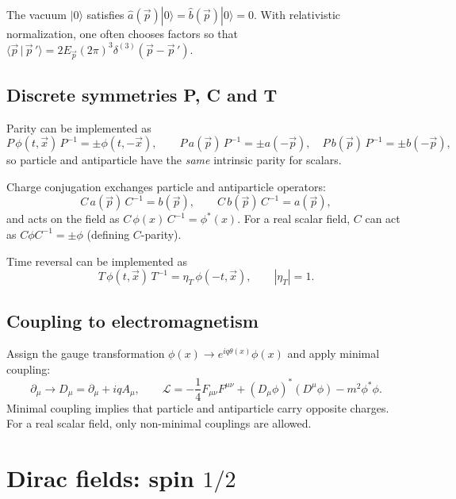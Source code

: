The vacuum $|0\rangle$ satisfies $\hat a(\vec p)|0\rangle=\hat b(\vec p)|0\rangle=0$.
With relativistic normalization, one often chooses factors so that
$\langle \vec p\,|\,\vec p\,'\rangle = 2E_{\vec p}(2\pi)^3\delta^{(3)}(\vec p-\vec p\,')$.

\subsection{Discrete symmetries P, C and T}
Parity can be implemented as
\begin{equation}
P\,\phi(t,\vec x)\,P^{-1}=\pm \phi(t,-\vec x),
\qquad
P\,a(\vec p)\,P^{-1}=\pm a(-\vec p),\quad
P\,b(\vec p)\,P^{-1}=\pm b(-\vec p),
\end{equation}
so particle and antiparticle have the \emph{same} intrinsic parity for scalars.

Charge conjugation exchanges particle and antiparticle operators:
\begin{equation}
C\,a(\vec p)\,C^{-1}=b(\vec p),\qquad C\,b(\vec p)\,C^{-1}=a(\vec p),
\end{equation}
and acts on the field as $C\,\phi(x)\,C^{-1}=\phi^\ast(x)$.
For a real scalar field, $C$ can act as $C\phi C^{-1}=\pm\phi$ (defining $C$-parity).

Time reversal can be implemented as
\begin{equation}
T\,\phi(t,\vec x)\,T^{-1}=\eta_T\,\phi(-t,\vec x),\qquad |\eta_T|=1.
\end{equation}

\subsection{Coupling to electromagnetism}
Assign the gauge transformation $\phi(x)\to e^{iq\theta(x)}\phi(x)$ and apply minimal coupling:
\begin{equation}
\partial_\mu\to D_\mu=\partial_\mu+i q A_\mu,\qquad
\mathcal L = -\frac14 F_{\mu\nu}F^{\mu\nu} + (D_\mu\phi)^\ast(D^\mu\phi)-m^2\phi^\ast\phi.
\end{equation}
Minimal coupling implies that particle and antiparticle carry opposite charges.
For a real scalar field, only non-minimal couplings are allowed.

\section{Dirac fields: spin $1/2$}
